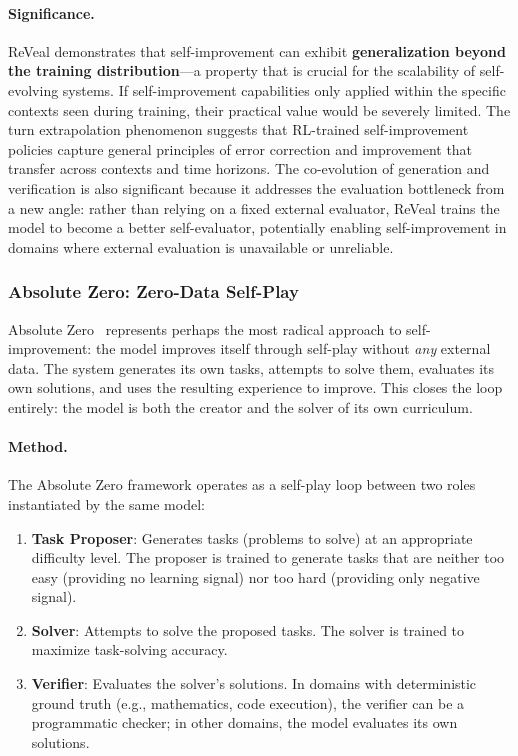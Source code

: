 \paragraph{Significance.}
ReVeal demonstrates that self-improvement can exhibit \textbf{generalization beyond the training distribution}---a property that is crucial for the scalability of self-evolving systems. If self-improvement capabilities only applied within the specific contexts seen during training, their practical value would be severely limited. The turn extrapolation phenomenon suggests that RL-trained self-improvement policies capture general principles of error correction and improvement that transfer across contexts and time horizons. The co-evolution of generation and verification is also significant because it addresses the evaluation bottleneck from a new angle: rather than relying on a fixed external evaluator, ReVeal trains the model to become a better self-evaluator, potentially enabling self-improvement in domains where external evaluation is unavailable or unreliable.


\subsubsection{Absolute Zero: Zero-Data Self-Play}
\label{sec:absolute-zero}

Absolute Zero~\citep{zhao2025absolutezero} represents perhaps the most radical approach to self-improvement: the model improves itself through self-play without \emph{any} external data. The system generates its own tasks, attempts to solve them, evaluates its own solutions, and uses the resulting experience to improve. This closes the loop entirely: the model is both the creator and the solver of its own curriculum.

\paragraph{Method.}
The Absolute Zero framework operates as a self-play loop between two roles instantiated by the same model:

\begin{enumerate}
    \item \textbf{Task Proposer}: Generates tasks (problems to solve) at an appropriate difficulty level. The proposer is trained to generate tasks that are neither too easy (providing no learning signal) nor too hard (providing only negative signal).
    \item \textbf{Solver}: Attempts to solve the proposed tasks. The solver is trained to maximize task-solving accuracy.
    \item \textbf{Verifier}: Evaluates the solver's solutions. In domains with deterministic ground truth (e.g., mathematics, code execution), the verifier can be a programmatic checker; in other domains, the model evaluates its own solutions.
\end{enumerate}

